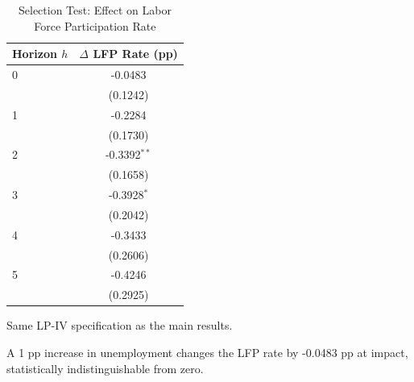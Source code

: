 \begin{table}[htbp]
\centering
\caption{Selection Test: Effect on Labor Force Participation Rate}
\label{tab:lfp}
\begin{tabular}{lc}
\hline\hline
Horizon $h$ & $\Delta$ LFP Rate (pp) \\
\hline
0 & -0.0483 \\
 & (0.1242) \\[3pt]
1 & -0.2284 \\
 & (0.1730) \\[3pt]
2 & -0.3392$^{**}$ \\
 & (0.1658) \\[3pt]
3 & -0.3928$^{*}$ \\
 & (0.2042) \\[3pt]
4 & -0.3433 \\
 & (0.2606) \\[3pt]
5 & -0.4246 \\
 & (0.2925) \\[3pt]
\hline\hline
\end{tabular}
\begin{tablenotes}\small
\item Same LP-IV specification as the main results.
\item A 1 pp increase in unemployment changes the LFP rate by -0.0483 pp at impact, statistically indistinguishable from zero.
\end{tablenotes}
\end{table}